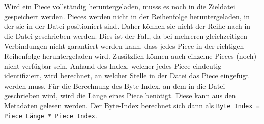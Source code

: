 Wird ein Piece vollständig heruntergeladen, musss es noch in die Zieldatei gespeichert werden. Pieces werden nicht in der Reihenfolge heruntergeladen, in der sie in der Datei positioniert sind. Daher können sie nicht der Reihe nach in die Datei geschrieben werden. Dies ist der Fall, da bei mehreren gleichzeitigen Verbindungen nicht garantiert werden kann, dass jedes Piece in der richtigen Reihenfolge heruntergeladen wird. Zusätzlich können auch einzelne Pieces (noch) nicht verfügbar sein. 
Anhand des Index, welcher jedes Piece eindeutig identifiziert, wird berechnet, an welcher Stelle in der Datei das Piece eingefügt werden muss. Für die Berechnung des Byte-Index, an dem in die Datei geschrieben wird, wird die Länge eines Piece benötigt. Diese kann aus den Metadaten gelesen werden. Der Byte-Index berechnet sich dann als \verb|Byte Index = Piece Länge * Piece Index|.
